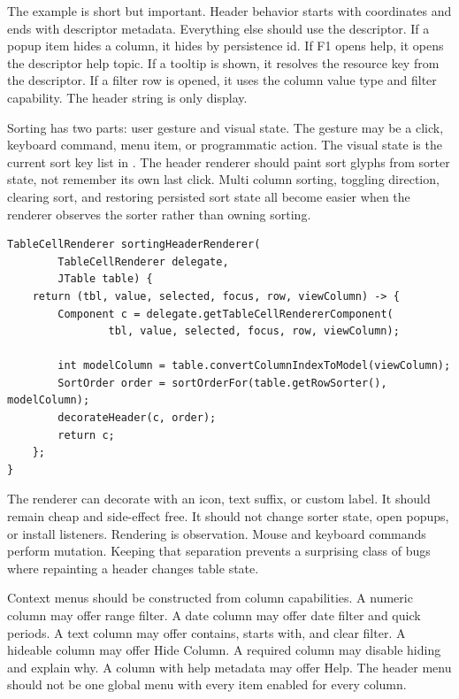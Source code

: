 The example is short but important. Header behavior starts with coordinates and ends
with descriptor metadata. Everything else should use the descriptor. If a popup item
hides a column, it hides by persistence id. If F1 opens help, it opens the descriptor
help topic. If a tooltip is shown, it resolves the resource key from the descriptor. If
a filter row is opened, it uses the column value type and filter capability. The header
string is only display.

Sorting has two parts: user gesture and visual state. The gesture may be a click,
keyboard command, menu item, or programmatic action. The visual state is the current
sort key list in
. The header renderer
should paint sort glyphs from sorter state, not remember its own last click. Multi
column sorting, toggling direction, clearing sort, and restoring persisted sort state
all become easier when the renderer observes the sorter rather than owning sorting.

\begin{lstlisting}[caption={A header renderer reads sort state rather than storing it.}]
TableCellRenderer sortingHeaderRenderer(
        TableCellRenderer delegate,
        JTable table) {
    return (tbl, value, selected, focus, row, viewColumn) -> {
        Component c = delegate.getTableCellRendererComponent(
                tbl, value, selected, focus, row, viewColumn);

        int modelColumn = table.convertColumnIndexToModel(viewColumn);
        SortOrder order = sortOrderFor(table.getRowSorter(), modelColumn);
        decorateHeader(c, order);
        return c;
    };
}
\end{lstlisting}

The renderer can decorate with an icon, text suffix, or custom label. It should remain
cheap and side-effect free. It should not change sorter state, open popups, or install
listeners. Rendering is observation. Mouse and keyboard commands perform mutation.
Keeping that separation prevents a surprising class of bugs where repainting a header
changes table state.

Context menus should be constructed from column capabilities. A numeric column may offer
range filter. A date column may offer date filter and quick periods. A text column may
offer contains, starts with, and clear filter. A hideable column may offer Hide Column.
A required column may disable hiding and explain why. A column with help metadata may
offer Help. The header menu should not be one global menu with every item enabled for
every column.

